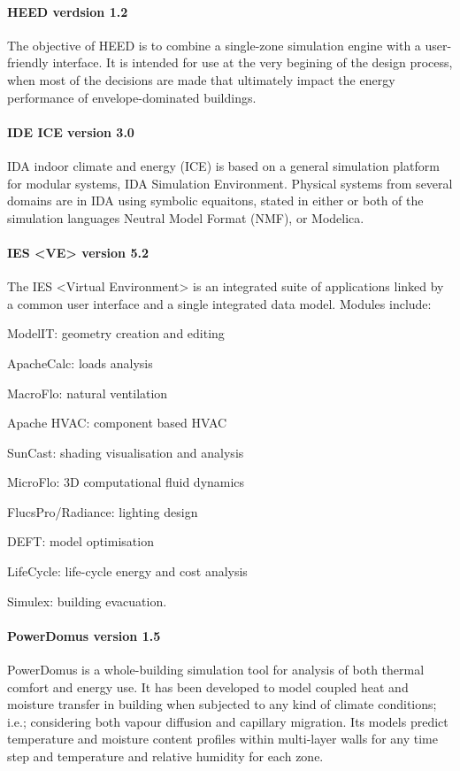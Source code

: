 \paragraph{HEED verdsion 1.2} The objective of HEED is to combine a single-zone simulation engine with a user-friendly interface. It is intended for use at the very begining of the design process, when most of the decisions are made that ultimately impact the energy performance of envelope-dominated buildings.

\paragraph{IDE ICE version 3.0} IDA indoor climate and energy (ICE) is based on a general simulation platform for modular systems, IDA Simulation Environment. Physical systems from several domains are in IDA using symbolic equaitons, stated in either or both of the simulation languages Neutral Model Format (NMF), or Modelica.

\paragraph{IES <VE> version 5.2} The IES <Virtual Environment> is an integrated suite of applications linked by a common user interface and a single integrated data model. Modules include:
\begin{inparaenum}
\item ModelIT: geometry creation and editing
\item ApacheCalc: loads analysis
\item MacroFlo: natural ventilation
\item Apache HVAC: component based HVAC
\item SunCast: shading visualisation and analysis
\item MicroFlo: 3D computational fluid dynamics 
\item FlucsPro/Radiance: lighting design
\item DEFT: model optimisation 
\item LifeCycle: life-cycle energy and cost analysis
\item Simulex: building evacuation. 
\end{inparaenum}

\paragraph{PowerDomus version 1.5} PowerDomus is a whole-building simulation tool for analysis of both thermal comfort and energy use. It has been developed to model coupled heat and moisture transfer in building when subjected to any kind of climate conditions; i.e.; considering both vapour diffusion and capillary migration. Its models predict temperature and moisture content profiles within multi-layer walls for any time step and temperature and relative humidity for each zone.

